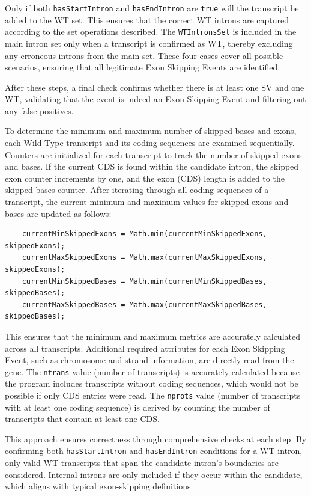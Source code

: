 \documentclass{article}
\begin{document}
    Only if both \texttt{hasStartIntron} and \texttt{hasEndIntron} are \texttt{true} will the transcript be added to the WT set. This ensures that the correct WT introns are captured according to the set operations described. The \texttt{WTIntronsSet} is included in the main intron set only when a transcript is confirmed as WT, thereby excluding any erroneous introns from the main set. These four cases cover all possible scenarios, ensuring that all legitimate Exon Skipping Events are identified.

    After these steps, a final check confirms whether there is at least one SV and one WT, validating that the event is indeed an Exon Skipping Event and filtering out any false positives.

    To determine the minimum and maximum number of skipped bases and exons, each Wild Type transcript and its coding sequences are examined sequentially. Counters are initialized for each transcript to track the number of skipped exons and bases. If the current CDS is found within the candidate intron, the skipped exon counter increments by one, and the exon (CDS) length is added to the skipped bases counter. After iterating through all coding sequences of a transcript, the current minimum and maximum values for skipped exons and bases are updated as follows:

    \begin{verbatim}
    currentMinSkippedExons = Math.min(currentMinSkippedExons, skippedExons);
    currentMaxSkippedExons = Math.max(currentMaxSkippedExons, skippedExons);
    currentMinSkippedBases = Math.min(currentMinSkippedBases, skippedBases);
    currentMaxSkippedBases = Math.max(currentMaxSkippedBases, skippedBases);
    \end{verbatim}

    This ensures that the minimum and maximum metrics are accurately calculated across all transcripts. Additional required attributes for each Exon Skipping Event, such as chromosome and strand information, are directly read from the gene. The \texttt{ntrans} value (number of transcripts) is accurately calculated because the program includes transcripts without coding sequences, which would not be possible if only CDS entries were read. The \texttt{nprots} value (number of transcripts with at least one coding sequence) is derived by counting the number of transcripts that contain at least one CDS.

    This approach ensures correctness through comprehensive checks at each step. By confirming both \texttt{hasStartIntron} and \texttt{hasEndIntron} conditions for a WT intron, only valid WT transcripts that span the candidate intron’s boundaries are considered. Internal introns are only included if they occur within the candidate, which aligns with typical exon-skipping definitions.
\end{document}
